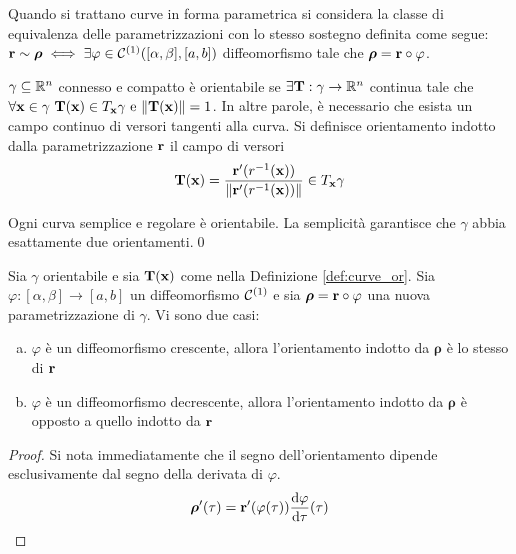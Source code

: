 \begin{remark}
	Quando si trattano curve in forma parametrica si considera la classe di equivalenza delle parametrizzazioni con lo stesso sostegno definita come segue: $\vb{r}\sim\bm\rho \iff \exists \varphi \in \mathcal{C}^{(1)}([\alpha,\beta],[a,b])$ diffeomorfismo tale che $\bm\rho=\vb{r}\circ\varphi$.
\end{remark}

\begin{definition}
	\label{def:curve_or}
	$\gamma \subseteq \mathbb{R}^n$ connesso e compatto è orientabile se $\exists \vb{T}: \gamma \to \mathbb{R}^n$ continua tale che $\forall \vb{x} \in \gamma \ \vb{T}(\vb{x})\in T_{\vb{x}}\gamma \text{ e } \norm{\vb{T}(\vb{x})}=1$. In altre parole, è necessario che esista un campo continuo di versori tangenti alla curva. Si definisce orientamento indotto dalla parametrizzazione $\vb{r}$ il campo di versori
	$$
		\vb{T}(\vb{x})=\frac{\vb{r}'(r^{-1}(\vb{x}))}{\norm{\vb{r}'(r^{-1}(\vb{x}))}} \in T_{\vb{x}}\gamma
	$$
\end{definition}

\begin{lemma}
	Ogni curva semplice e regolare è orientabile. La semplicità garantisce che $\gamma$ abbia esattamente due orientamenti.\qed
\end{lemma}

\begin{theorem}
	Sia $\gamma$ orientabile e sia $\vb{T}(\vb{x})$ come nella Definizione \ref{def:curve_or}. Sia $\varphi:[\alpha,\beta]\to[a,b]$ un diffeomorfismo $\mathcal{C}^{(1)}$ e sia $\bm\rho=\vb{r}\circ\varphi$ una nuova parametrizzazione di $\gamma$. Vi sono due casi:
	\begin{enumerate}[a.]
		\item $\varphi$ è un diffeomorfismo crescente, allora l'orientamento indotto da $\bm\rho$ è lo stesso di $\vb{r}$
		\item $\varphi$ è un diffeomorfismo decrescente, allora l'orientamento indotto da $\bm\rho$ è opposto a quello indotto da $\vb{r}$
	\end{enumerate}
\end{theorem}

\begin{proof} Si nota immediatamente che il segno dell'orientamento dipende esclusivamente dal segno della derivata di $\varphi$.
	$$
		\bm\rho'(\tau)=\vb{r}'(\varphi(\tau))\frac{\dd \varphi}{\dd \tau}(\tau)
	$$
\end{proof}

